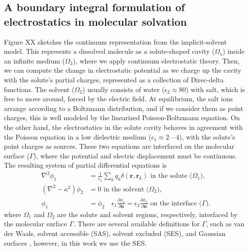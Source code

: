 \subsection{A boundary integral formulation of electrostatics in molecular solvation}

Figure XX sketches the continuum representation from the implicit-solvent model. 
This represents a dissolved molecule as a solute-shaped cavity ($\Omega_1$) inside an infinite medium ($\Omega_2$), where we apply continuum electrostatic theory.
Then, we can compute the change in electrostatic potential as we charge up the cavity with the solute's partial charges, represented as a collection of Direc-delta functions.
The solvent ($\Omega_2$) usually consists of water ($\epsilon_2\approx$80) with salt, which is free to move around, forced by the electric field. 
At equilibrium, the salt ions arrange according to a Boltzmann distribution, and if we consider them as point charges, this is well modeled by the linearized Poisson-Boltzmann equation. 
On the other hand, the electrostatics in the solute cavity behaves in agreement with the Poisson equation in a low dielectric medium ($\epsilon_1\approx$2---4), with the solute's point charges as sources.
These two equations are interfaced on the molecular surface ($\Gamma$), where the potential and electric displacement must be continuous.
The resulting system of partial differential equations is
%
\begin{align} \label{eq:pde}
\nabla^2\phi_1 &= \frac{1}{\epsilon_1}\sum_k q_k\delta(\mathbf{r},\mathbf{r}_k) \text{ in the solute ($\Omega_1$),}\nonumber\\
(\nabla^2-\kappa^2)\phi_2 &= 0 \text{ in the solvent ($\Omega_2$),}\nonumber\\
\phi_1 &= \phi_2 \quad \epsilon_1\frac{\partial \phi_1}{\partial\mathbf{n}} = \epsilon_2\frac{\partial \phi_2}{\partial\mathbf{n}} \text{ on the interface ($\Gamma$)}.
\end{align}
%
where $\Omega_1$ and $\Omega_2$ are the solute and solvent regions, respectively, interfaced by the molecular surface $\Gamma$.
There are several available definitions for $\Gamma$, such as van der Waals, solvent accessible (SAS), solvent excluded (SES), and Gaussian surfaces \cite{HarrisFenley2013}, however, in this work we use the SES.

